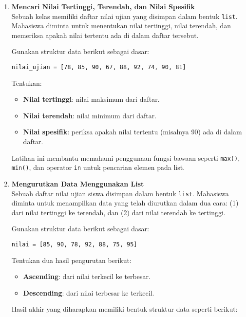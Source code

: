 \begin{enumerate}
\item \textbf{Mencari Nilai Tertinggi, Terendah, dan Nilai Spesifik} \\
Sebuah kelas memiliki daftar nilai ujian yang disimpan dalam bentuk \texttt{list}. 
Mahasiswa diminta untuk menentukan nilai tertinggi, nilai terendah, 
dan memeriksa apakah nilai tertentu ada di dalam daftar tersebut.  

Gunakan struktur data berikut sebagai dasar:

\begin{lstlisting}[style=PythonStyle]
nilai_ujian = [78, 85, 90, 67, 88, 92, 74, 90, 81]
\end{lstlisting}

Tentukan:
\begin{itemize}
  \item \textbf{Nilai tertinggi}: nilai maksimum dari daftar.
  \item \textbf{Nilai terendah}: nilai minimum dari daftar.
  \item \textbf{Nilai spesifik}: periksa apakah nilai tertentu (misalnya 90) ada di dalam daftar.
\end{itemize}


Latihan ini membantu memahami penggunaan fungsi bawaan seperti 
\texttt{max()}, \texttt{min()}, dan operator \texttt{in} untuk pencarian elemen pada list.

\item \textbf{Mengurutkan Data Menggunakan List} \\
Sebuah daftar nilai ujian siswa disimpan dalam bentuk \texttt{list}. 
Mahasiswa diminta untuk menampilkan data yang telah diurutkan dalam dua cara:  
(1) dari nilai tertinggi ke terendah, dan  
(2) dari nilai terendah ke tertinggi.

Gunakan struktur data berikut sebagai dasar:

\begin{lstlisting}[style=PythonStyle]
nilai = [85, 90, 78, 92, 88, 75, 95]
\end{lstlisting}

Tentukan dua hasil pengurutan berikut:
\begin{itemize}
  \item \textbf{Ascending}: dari nilai terkecil ke terbesar.
  \item \textbf{Descending}: dari nilai terbesar ke terkecil.
\end{itemize}

Hasil akhir yang diharapkan memiliki bentuk struktur data seperti berikut:


\end{enumerate}
